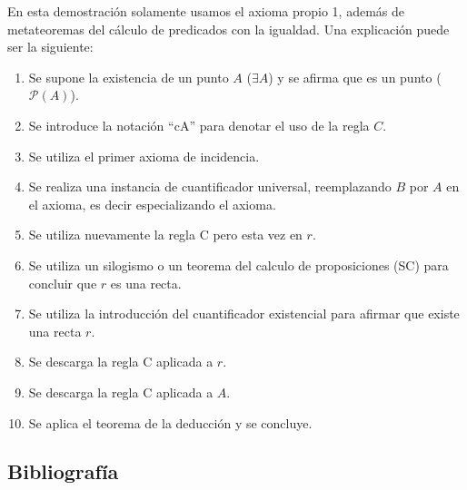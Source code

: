 En esta demostración solamente usamos el axioma propio 1, además de metateoremas del cálculo de predicados con la igualdad. Una explicación puede ser la siguiente:
\begin{enumerate}
	\item Se supone la existencia de un punto $A$ ($\exists A$) y se afirma que es un punto ($\mathcal{P}(A)$).
	\item Se introduce la notación “cA” para denotar el uso de la regla $C$.
	\item Se utiliza el primer axioma de incidencia.
	\item Se realiza una instancia de cuantificador universal, reemplazando $B$ por $A$ en el axioma, es decir especializando el axioma.
	\item Se utiliza nuevamente la regla C pero esta vez en $r$.
	\item Se utiliza un silogismo o un teorema del calculo de proposiciones (SC) para concluir que $r$ es una recta.
	\item Se utiliza la introducción del cuantificador existencial para afirmar que existe una recta $r$. 
	\item Se descarga la regla C aplicada a $r$.
	\item Se descarga la regla C aplicada a $A$.
	\item Se aplica el teorema de la deducción y se concluye.
\end{enumerate}

\subsection{Bibliografía}

\printbibliography[keyword={11}]